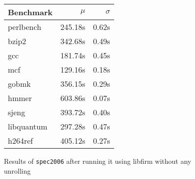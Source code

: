 \begin{figure}[th]
    \begin{center}
        \begin{tabular}{lrr}
            \toprule
            Benchmark & $\mu$ & $\sigma$\\
            \midrule
            perlbench & 245.18s & 0.62s\\
            bzip2 & 342.68s & 0.49s\\
            gcc & 181.74s & 0.45s\\
            mcf & 129.16s & 0.18s\\
            gobmk & 356.15s & 0.29s\\
            hmmer & 603.86s & 0.07s\\
            sjeng & 393.72s & 0.40s\\
            libquantum & 297.28s & 0.47s\\
            h264ref & 405.12s & 0.27s\\
            \bottomrule
        \end{tabular}
    \end{center}
    \caption{Results of \texttt{spec2006} after running it using libfirm without any unrolling}
    \label{fig:eval:perf:ref}
\end{figure}
